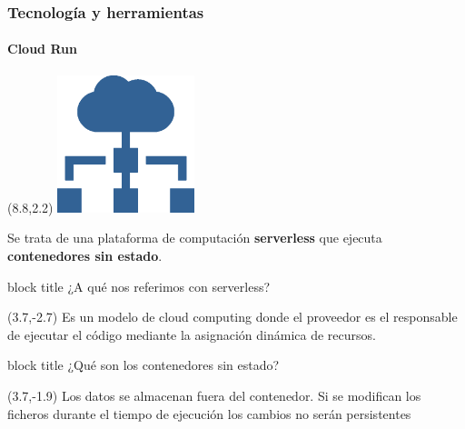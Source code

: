 \documentclass[10pt]{beamer}
\begin{document}
\begin{frame}
\frametitle{Tecnología y herramientas}
\framesubtitle{Cloud Run}

\begin{textblock}{8}(8.8,2.2)
	\includegraphics[width =0.30\textwidth]{Figuras/desarrollo-web}
\end{textblock}
\vspace{-0.2cm}
Se trata de una plataforma de computación \textbf{\textcolor{burgundy}{serverless}} que ejecuta \textbf{\textcolor{burgundy}{contenedores sin estado}}. \pause \vspace{0.8cm} \newline
\begin{beamercolorbox}[sep=0.6em,ht=1.6cm, wd=2.9cm,center,rounded=true,shadow=true]{block title}
\large ¿A qué nos referimos con serverless? 
\end{beamercolorbox} \vspace{1cm} \pause
\begin{textblock}{5}(3.7,-2.7)
\small Es un modelo de cloud computing donde el proveedor es el responsable de ejecutar el código mediante la asignación dinámica de recursos.
\end{textblock} \pause
\begin{beamercolorbox}[sep=0.6em,ht=1.6cm,wd=2.9cm,center,rounded=true,shadow=true]{block title}
\large ¿Qué son los contenedores sin estado?
\end{beamercolorbox} \pause
\begin{textblock}{5}(3.7,-1.9)
\small Los datos se almacenan fuera del contenedor. Si se modifican los ficheros durante el tiempo de ejecución los cambios no serán persistentes
\end{textblock}\end{frame}
\end{document}
